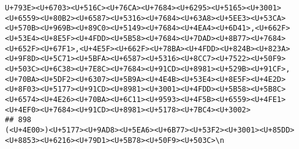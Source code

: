 \documentclass[
]{article}
\begin{document}
\begin{verbatim}
U+793E><U+6703><U+516C><U+76CA><U+7684><U+6295><U+5165><U+3001><U+6559><U+80B2><U+6587><U+5316><U+7684><U+63A8><U+5EE3><U+53CA><U+570B><U+969B><U+89C0><U+5149><U+7684><U+4EA4><U+6D41>,<U+662F><U+53E4><U+8E5F><U+4FDD><U+5B58><U+7684><U+7DAD><U+8B77><U+7684><U+652F><U+67F1>,<U+4E5F><U+662F><U+78BA><U+4FDD><U+824B><U+823A><U+9F8D><U+5C71><U+5BFA><U+6587><U+5316><U+8CC7><U+7522><U+50F9><U+503C><U+6C38><U+7E8C><U+7684><U+91CD><U+8981><U+529B><U+91CF>,<U+70BA><U+5DF2><U+6307><U+5B9A><U+4E4B><U+53E4><U+8E5F><U+4E2D><U+8F03><U+5177><U+91CD><U+8981><U+3001><U+4FDD><U+5B58><U+5B8C><U+6574><U+4E26><U+70BA><U+6C11><U+9593><U+4F5B><U+6559><U+4FE1><U+4EF0><U+7684><U+91CD><U+8981><U+5178><U+7BC4><U+3002>
## 898                                                                                                                                                                                                                                                                                                                                                                                                                                                                                                                                                                                                                                                                                                                                                                                                                                                                                                                                                                                                                                                                                                                                                                                                                                                                                                                                                                                                                                                                                                                                                                                                                                                                                                                                                                                                                                                                                                                                                                                                                                                                                                                                                                                                                                                                                                                                                                                                             (<U+4E00>)<U+5177><U+9AD8><U+5EA6><U+6B77><U+53F2><U+3001><U+85DD><U+8853><U+6216><U+79D1><U+5B78><U+50F9><U+503C>\n  
\end{verbatim}
\end{document}
